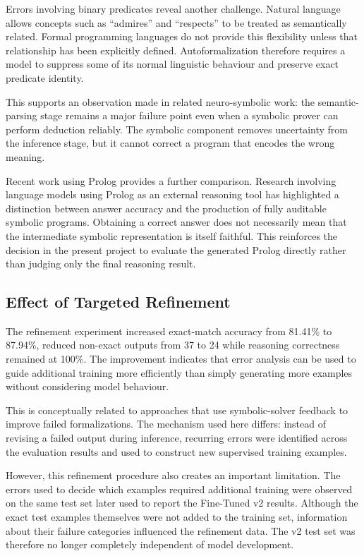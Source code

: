 \documentclass[11pt]{article} %
\theoremstyle{plain}
\theoremstyle{definition}
\begin{document}
Errors involving binary predicates reveal another challenge. Natural language
allows concepts such as ``admires'' and ``respects'' to be treated as
semantically related. Formal programming languages do not provide this
flexibility unless that relationship has been explicitly defined.
Autoformalization therefore requires a model to suppress some of its normal
linguistic behaviour and preserve exact predicate identity.

This supports an observation made in related neuro-symbolic work: the
semantic-parsing stage remains a major failure point even when a symbolic
prover can perform deduction reliably. The symbolic component removes
uncertainty from the inference stage, but it cannot correct a program that
encodes the wrong meaning.

Recent work using Prolog provides a further comparison. Research involving
language models using Prolog as an external reasoning tool has highlighted a
distinction between answer accuracy and the production of fully auditable
symbolic programs. Obtaining a correct answer does not necessarily mean that
the intermediate symbolic representation is itself faithful. This reinforces
the decision in the present project to evaluate the generated Prolog directly
rather than judging only the final reasoning result.


\subsection{Effect of Targeted Refinement}

The refinement experiment increased exact-match accuracy from 81.41\% to
87.94\%, reduced non-exact outputs from 37 to 24 while reasoning
correctness remained at 100\%. The improvement indicates that error analysis
can be used to guide additional training more efficiently than simply
generating more examples without considering model behaviour.

This is conceptually related to approaches that use symbolic-solver feedback
to improve failed formalizations. The mechanism used here differs: instead of
revising a failed output during inference, recurring errors were identified
across the evaluation results and used to construct new supervised training
examples.

However, this refinement procedure also creates an important limitation. The
errors used to decide which examples required additional training were observed
on the same test set later used to report the Fine-Tuned v2 results. Although
the exact test examples themselves were not added to the training set,
information about their failure categories influenced the refinement data. The
v2 test set was therefore no longer completely independent of model
development.
\end{document}
